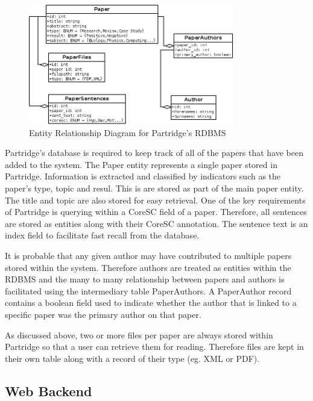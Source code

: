 \begin{figure}[th]
\vspace{5mm}
\centering
\includegraphics[width=0.8\textwidth]{images/design/e-r-diagram.png}
\caption{Entity Relationship Diagram for Partridge's RDBMS}
\label{fig:e-r-diagram}
\end{figure}

Partridge's database is required to keep track of all of the papers that have
been added to the system. The Paper entity represents a single paper stored in
Partridge. Information is extracted and classified by indicators such as the paper's type,
topic and resul. This is are stored as part of the main paper entity. The title and
topic are also stored for easy retrieval. One of the key requirements of
Partridge is querying within a CoreSC field of a paper. Therefore, all
sentences are stored as entities along with their CoreSC annotation. The sentence
text is an index field to facilitate fast recall from the database.

It is probable that any given author may have contributed to multiple papers
stored within the system.  Therefore authors are treated as entities within the
RDBMS and the many to many relationship between papers and authors is
facilitated using the intermediary table PaperAuthors. A PaperAuthor record
contains a boolean field used to indicate whether the author that is linked to a
specific paper was the primary author on that paper.

As discussed above, two or more files per paper are always stored within
Partridge so that a user can retrieve them for reading. Therefore files are
kept in their own table along with a record of their type (eg. XML or PDF). 

\subsection{ Web Backend }

